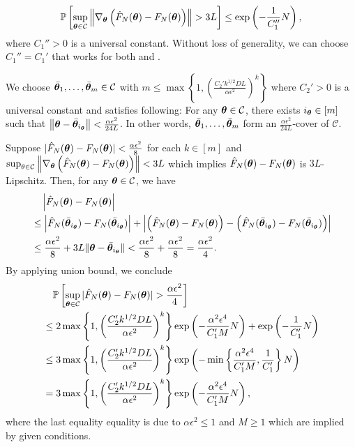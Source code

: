 \begin{equation}
\label{eq:lemmaminimizer_dependent-3}
 \mathbb{P}\left[ \sup_{{\bm{\theta}} \in \mathcal{C}}\left\lVert \nabla_{\bm{\theta}} \left( \hat{F}_N({\bm{\theta}}) - F_N({\bm{\theta}}) \right)\right\rVert > 3 L \right] 
 \leq \exp \left(-\frac{1}{C_1''}N\right),
\end{equation}
where $C_1''>0$ is a universal constant. Without loss of generality, we can choose $C_1'' = C_1'$ that works for both  and .


We choose $\bar{{\bm{\theta}}}_1, \dots, \bar{{\bm{\theta}}}_m \in \mathcal{C}$ with $m \leq \max \left\{1, \left(\frac{C_2'k^{1/2} D L}{\alpha \epsilon^2 }\right)^k \right\}$ where $C_2'>0$ is a universal constant and satisfies following: 
For any ${\bm{\theta}} \in \mathcal{C}$, there exists $i_{\bm{\theta}} \in [m]$ such that $\left \lVert {\bm{\theta}} - \bar{{\bm{\theta}}}_{i_{\bm{\theta}}} \right \rVert< \frac{\alpha \epsilon^2}{24L}$. In other words, $\bar{{\bm{\theta}}}_1, \dots, \bar{{\bm{\theta}}}_m$ form an $\frac{\alpha \epsilon^2}{24L}$-cover of $\mathcal {C}$.

Suppose $| \hat{F}_N({\bm{\theta}}) - F_N({\bm{\theta}}) | < \frac{\alpha \epsilon^2}{8}$  for each $k \in [m]$ and $\sup_{\theta \in \mathcal{C}}\left\lVert \nabla_{\bm{\theta}} \left( \hat{F}_N({\bm{\theta}}) - F_N({\bm{\theta}}) \right)\right\rVert < 3L$ which implies $\hat{F}_N({\bm{\theta}})-F_N({\bm{\theta}})$ is $3L$-Lipschitz. Then, for any ${\bm{\theta}} \in \mathcal{C}$, we have
\begin{align*}
   &\quad \left | \hat{F}_N({\bm{\theta}}) - F_N({\bm{\theta}}) \right| \\
   &\leq \left | \hat{F}_N(\bar{{\bm{\theta}}}_{i_{\bm{\theta}}}) - F_N(\bar{{\bm{\theta}}}_{i_{\bm{\theta}}}) \right| +  \left |\left( \hat{F}_N({\bm{\theta}}) - F_N({\bm{\theta}}) \right) -  \left  (\hat{F}_N(\bar{{\bm{\theta}}}_{i_{\bm{\theta}}}) - F_N(\bar{{\bm{\theta}}}_{i_{\bm{\theta}}}) \right) \right|\\
    &\leq \frac{\alpha \epsilon^2}{8} + 3L \lVert {\bm{\theta}} - \bar{{\bm{\theta}}}_{i_{\bm{\theta}}} \rVert < \frac{\alpha \epsilon^2}{8} + \frac{\alpha \epsilon^2}{8} = \frac{\alpha \epsilon^2}{4}.
\end{align*}
By applying union bound, we conclude
\begin{align*}
    &\quad \mathbb{P}\left[ \sup_{{\bm{\theta}} \in \mathcal{C}}|\hat{F}_N({\bm{\theta}}) - F_N({\bm{\theta}})| >  \frac{\alpha \epsilon^2}{4} \right] \\
    &\leq 2\max \left \{1, \left(\frac{C_2'k^{1/2} DL}{\alpha \epsilon^2 }\right)^k \right \} \exp\left(- \frac{ \alpha^2 \epsilon^4}{C_1' M}N \right) + \exp\left(-\frac{1}{C_1'}N \right)\\ &\leq 3 \max \left \{1, \left(\frac{C_2'k^{1/2} DL}{\alpha \epsilon^2 }\right)^k \right \} \exp \left( - \min \left\{ \frac{\alpha^2 \epsilon^4}{C_1' M}, \frac{1}{C_1'}\right \} N \right)\\
    &=3 \max \left \{1, \left(\frac{C_2'k^{1/2} D L}{\alpha \epsilon^2 }\right)^k \right \} \exp \left( -  \frac{\alpha^2 \epsilon^4}{C_1' M} N \right),
\end{align*}
where the last equality equality is due to $ \alpha \epsilon^2 \leq 1$ and $M\geq 1$ which are implied by given conditions.

